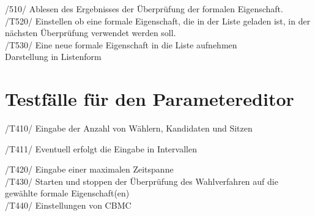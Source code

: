 \documentclass[a4paper]{scrreprt}
\begin{document}
/510/ Ablesen des Ergebnisses der Überprüfung der formalen Eigenschaft. \\
/T520/ Einstellen ob eine formale Eigenschaft, die in der Liste geladen ist, in der \\ nächsten Überprüfung verwendet werden soll. \\
/T530/ Eine neue formale Eigenschaft in die Liste aufnehmen \\
Darstellung in Listenform


\section{Testfälle für den Parametereditor}

/T410/ Eingabe der Anzahl von Wählern, Kandidaten und Sitzen
\begin{addmargin}[25pt]{0pt}
/T411/ Eventuell erfolgt die Eingabe in Intervallen
\end{addmargin}	
/T420/ Eingabe einer maximalen Zeitspanne \\
/T430/ Starten und stoppen der Überprüfung des Wahlverfahren auf die gewählte formale Eigenschaft(en) \\
/T440/ Einstellungen von CBMC \\
\end{document}
